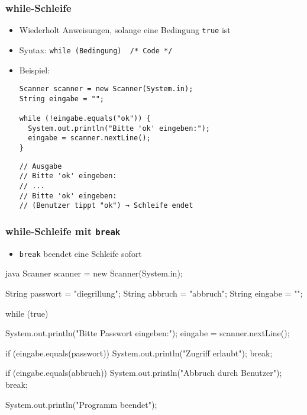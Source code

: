 \documentclass{../../presentation}
\begin{document}
\begin{frame}[fragile]
  \frametitle{while-Schleife}

  \begin{itemize}
    \item<1-> Wiederholt Anweisungen, solange eine Bedingung \texttt{true} ist    
    \item<1-> Syntax: \texttt{while (Bedingung) { /* Code */ }}
    \item<2-> Beispiel:
      \begin{verbatim}
Scanner scanner = new Scanner(System.in);
String eingabe = "";

while (!eingabe.equals("ok")) {
  System.out.println("Bitte 'ok' eingeben:");
  eingabe = scanner.nextLine();
}
      \end{verbatim}
      
      \begin{verbatim}
// Ausgabe
// Bitte 'ok' eingeben:
// ...
// Bitte 'ok' eingeben:
// (Benutzer tippt "ok") → Schleife endet
      \end{verbatim}
    
      \end{itemize}

\end{frame}



\begin{frame}[fragile]
  \frametitle{while-Schleife mit \texttt{break}}

  \begin{itemize}
    \item<1-> \texttt{break} beendet eine Schleife sofort
\end{itemize}
\begin{code}{java}
Scanner scanner = new Scanner(System.in);

String passwort = "diegrillung";
String abbruch = "abbruch";
String eingabe = "";

while (true) {
  System.out.println("Bitte Passwort eingeben:");
  eingabe = scanner.nextLine();

  if (eingabe.equals(passwort)) {
    System.out.println("Zugriff erlaubt");
    break;
  }

  if (eingabe.equals(abbruch)) {
    System.out.println("Abbruch durch Benutzer");
    break;
  }
}
System.out.println("Programm beendet");
\end{code}
  
\end{frame}
\end{document}
